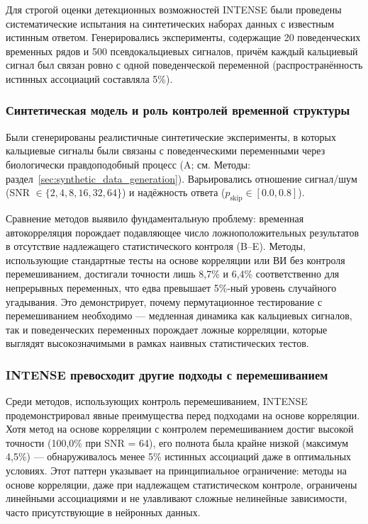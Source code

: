 Для строгой оценки детекционных возможностей INTENSE были проведены систематические
испытания на синтетических наборах данных с известным истинным ответом. Генерировались эксперименты,
содержащие 20 поведенческих временных рядов и 500 псевдокальциевых сигналов, причём каждый
кальциевый сигнал был связан ровно с одной поведенческой переменной (распространённость истинных
ассоциаций составляла 5\%).

\subsubsection{Синтетическая модель и роль контролей временной структуры}
\label{sec:bio_synthetic}

Были сгенерированы реалистичные синтетические эксперименты, в которых кальциевые сигналы были
связаны с поведенческими переменными через биологически правдоподобный процесс
(A; см. Методы: раздел~\ref{sec:synthetic_data_generation}).
Варьировались отношение сигнал/шум
(SNR $\in \{2, 4, 8, 16, 32, 64\}$) и надёжность ответа
($p_{\text{skip}} \in [0.0, 0.8]$).

Сравнение методов выявило фундаментальную проблему: временная автокорреляция
порождает подавляющее число ложноположительных результатов в отсутствие надлежащего статистического контроля
(B--E). Методы, использующие стандартные тесты на основе корреляции или ВИ
без контроля перемешиванием, достигали точности лишь 8,7\% и 6,4\%
соответственно для непрерывных переменных, что едва превышает 5\%-ный уровень случайного угадывания.
Это демонстрирует, почему пермутационное тестирование с перемешиванием необходимо --- медленная
динамика как кальциевых сигналов, так и поведенческих переменных порождает ложные
корреляции, которые выглядят высокозначимыми в рамках наивных статистических тестов.

\subsubsection{INTENSE превосходит другие подходы с перемешиванием}
\label{sec:intense_outperforms}

Среди методов, использующих контроль перемешиванием, INTENSE продемонстрировал явные преимущества перед
подходами на основе корреляции. Хотя метод на основе корреляции с контролем перемешиванием достиг высокой
точности (100,0\% при SNR = 64), его полнота была крайне низкой
(максимум 4,5\%) ---
обнаруживалось менее 5\% истинных ассоциаций даже в оптимальных
условиях. Этот паттерн указывает на принципиальное ограничение: методы на основе корреляции,
даже при надлежащем статистическом контроле, ограничены линейными
ассоциациями и не улавливают сложные нелинейные зависимости, часто присутствующие в нейронных
данных.

